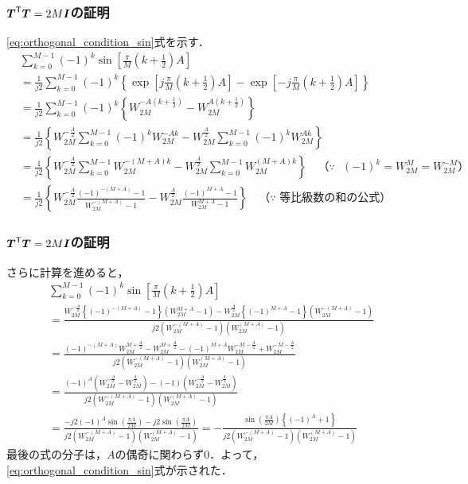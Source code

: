 \documentclass[14pt,xcolor=dvipsnames,table,dvipdfmx]{beamer}
\begin{document}
\begin{frame}[c]
    \frametitle{$\boldsymbol{T}^{\mathsf{T}} \boldsymbol{T} = 2M\boldsymbol{I}$の証明}
    \eqref{eq:orthogonal_condition_sin}式を示す．
    \scriptsize
    \begin{align*}
        & \sum_{k = 0}^{M - 1} (-1)^{k} \sin\left[ \frac{\pi}{M} \left( k + \frac{1}{2} \right) A  \right] \\
        &= \frac{1}{j2} \sum_{k = 0}^{M - 1} (-1)^{k} \left\{ \exp\left[ j \frac{\pi}{M} \left( k + \frac{1}{2} \right) A  \right] - \exp\left[ -j \frac{\pi}{M} \left( k + \frac{1}{2} \right) A  \right] \right\} \\
        &= \frac{1}{j2} \sum_{k = 0}^{M - 1} (-1)^{k} \left\{ W_{2M}^{-A\left( k + \frac{1}{2} \right)} - W_{2M}^{A\left( k + \frac{1}{2} \right)} \right\} \\
        &= \frac{1}{j2} \left\{ W_{2M}^{-\frac{A}{2}} \sum_{k = 0}^{M - 1} (-1)^{k} W_{2M}^{-Ak} - W_{2M}^{\frac{A}{2}} \sum_{k = 0}^{M - 1} (-1)^{k} W_{2M}^{Ak} \right\} \\
        &= \frac{1}{j2} \left\{ W_{2M}^{-\frac{A}{2}} \sum_{k = 0}^{M - 1} W_{2M}^{-(M + A)k} - W_{2M}^{\frac{A}{2}} \sum_{k = 0}^{M - 1} W_{2M}^{(M + A)k} \right\} \quad \text{（$\because$ $(-1)^{k} = W_{2M}^{M} = W_{2M}^{-M}$）} \\
        &= \frac{1}{j2} \left\{ W_{2M}^{-\frac{A}{2}} \frac{(-1)^{-(M + A)} - 1}{W_{2M}^{-(M + A)} - 1} - W_{2M}^{\frac{A}{2}} \frac{(-1)^{M + A} - 1}{W_{2M}^{M + A} - 1} \right\} \quad \text{（$\because$ 等比級数の和の公式）}
    \end{align*}
\end{frame}

\begin{frame}[c]
    \frametitle{$\boldsymbol{T}^{\mathsf{T}} \boldsymbol{T} = 2M\boldsymbol{I}$の証明}
    さらに計算を進めると，
    \scriptsize
    \begin{align*}
        & \sum_{k = 0}^{M - 1} (-1)^{k} \sin\left[ \frac{\pi}{M} \left( k + \frac{1}{2} \right) A \right] \\
        &= \frac{W_{2M}^{-\frac{A}{2}} \left\{ (-1)^{-(M + A)} - 1 \right\} (W_{2M}^{M + A} - 1) - W_{2M}^{\frac{A}{2}} \left\{ (-1)^{M + A} - 1 \right\} (W_{2M}^{-(M + A)} - 1)}{j2(W_{2M}^{-(M + A)} - 1)(W_{2M}^{(M + A)} - 1)} \\
        &= \frac{(-1)^{-(M + A)} W_{2M}^{M + \frac{A}{2}} - W_{2M}^{M + \frac{A}{2}} - (-1)^{M + A} W_{2M}^{-M - \frac{A}{2}} + W_{2M}^{-M - \frac{A}{2}}}{j2(W_{2M}^{-(M + A)} - 1)(W_{2M}^{(M + A)} - 1)} \\
        &= \frac{(-1)^{A}(W_{2M}^{-\frac{A}{2}} - W_{2M}^{\frac{A}{2}}) - (-1)(W_{2M}^{-\frac{A}{2}} - W_{2M}^{\frac{A}{2}})}{j2(W_{2M}^{-(M + A)} - 1)(W_{2M}^{(M + A)} - 1)} \\
        &= \frac{-j2 (-1)^{A} \sin\left( \frac{\pi A}{2M} \right) -j2  \sin\left( \frac{\pi A}{2M} \right)}{j2(W_{2M}^{-(M + A)} - 1)(W_{2M}^{(M + A)} - 1)} = -\frac{\sin\left( \frac{\pi A}{2M} \right) \left\{ (-1)^{A} + 1 \right\}}{j2(W_{2M}^{-(M + A)} - 1)(W_{2M}^{(M + A)} - 1)}
    \end{align*}
    \normalsize
    最後の式の分子は，$A$の偶奇に関わらず$0$．よって，\eqref{eq:orthogonal_condition_sin}式が示された．
\end{frame}
\end{document}
